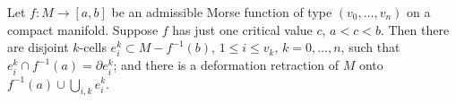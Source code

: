 Let $f: M \to [a, b]$ be an admissible Morse function of type $(v_0, \ldots, v_n)$ on a compact manifold. Suppose $f$ has just one critical value $c$, $a < c < b$. Then there are disjoint $k$-cells $e_i^k \subset M - f^{-1}(b)$, $1 \leqslant i \leqslant v_k$, $k = 0, \ldots, n$, such that $e_i^k \cap f^{-1}(a) = \partial e_i^k$; and there is a deformation retraction of $M$ onto $f^{-1}(a) \cup \bigcup_{i,k} e_i^k$.
